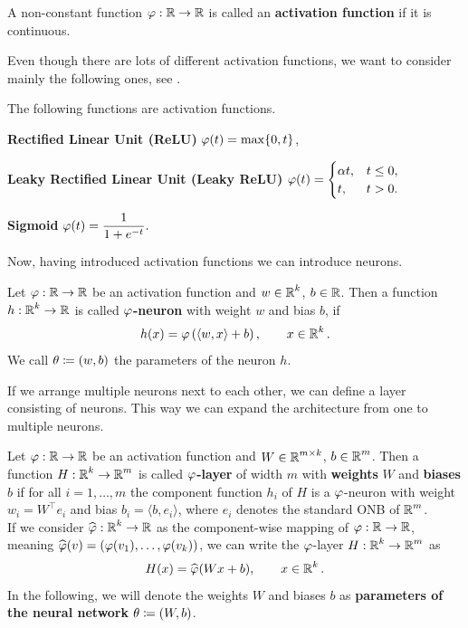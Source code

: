 \begin{definition}
A non-constant function $\operatorname{\varphi}: \operatorname{\mathbb{R}} \to \operatorname{\mathbb{R}}$ is called an \textbf{activation function} if it is continuous.
\end{definition}


Even though there are lots of different activation functions, we want to consider mainly the following ones, see \cite[chapter~6]{goodfellow2016deep}.


\begin{example}
The following functions are activation functions.
\begin{mydescription}{}
\item[\textbf{Rectified Linear Unit (ReLU)}] $\operatorname{\varphi}(t) = \max\{0, t\}$,
\item[\textbf{Leaky Rectified Linear Unit (Leaky ReLU)}] $\displaystyle \operatorname{\varphi}(t) = \begin{cases}
\alpha t, 	& t \leq 0,\\
t,		& t > 0.
\end{cases}$
\item[\textbf{Sigmoid}] $\displaystyle \operatorname{\varphi}(t) = \frac{1}{1 + e^{-t}}.$
\end{mydescription}
\end{example}


Now, having introduced activation functions we can introduce neurons.


\begin{definition}
Let $\operatorname{\varphi}: \operatorname{\mathbb{R}} \to \operatorname{\mathbb{R}}$ be an activation function and $w\in \operatorname{\mathbb{R}}^k$, $b \in \operatorname{\mathbb{R}}$. Then a function $h: \operatorname{\mathbb{R}}^k \to \operatorname{\mathbb{R}}$ is called \textbf{$\operatorname{\varphi}$-neuron} with weight $w$ and bias $b$, if
\begin{align}\label{def_neuron}
h(x) = \operatorname{\varphi} \left(\langle w, x \rangle + b \right), \qquad x \in \operatorname{\mathbb{R}}^k.
\end{align}
We call $\theta \coloneqq (w, b)$ the parameters of the neuron $h$.
\end{definition}


If we arrange multiple neurons next to each other, we can define a layer consisting of neurons. This way we can expand the architecture from one to multiple neurons.


\begin{definition}\label{def_layer}
Let $\operatorname{\varphi}: \operatorname{\mathbb{R}} \to \operatorname{\mathbb{R}}$ be an activation function and $W \in \operatorname{\mathbb{R}}^{m\times k}$, $b\in \operatorname{\mathbb{R}}^m$. Then a function $H:\operatorname{\mathbb{R}}^k \to \operatorname{\mathbb{R}}^m$ is called \textbf{$\operatorname{\varphi}$-layer} of width $m$ with \textbf{weights} $W$ and \textbf{biases} $b$ if for all $i=1,\ldots,m$ the component function $h_i$ of $H$ is a $\operatorname{\varphi}$-neuron with weight $w_i = W^\top e_i$ and bias $b_i = \langle b, e_i \rangle$, where $e_i$ denotes the standard ONB of $\operatorname{\mathbb{R}}^m$.\\
If we consider $\widehat{\operatorname{\varphi}}: \operatorname{\mathbb{R}}^k \to \operatorname{\mathbb{R}}$ as the component-wise mapping of $\operatorname{\varphi}:\operatorname{\mathbb{R}}\to \operatorname{\mathbb{R}}$, meaning $\widehat{\operatorname{\varphi}}(v) = (\operatorname{\varphi}(v_1), \ldots, \operatorname{\varphi}(v_k))$, we can write the $\operatorname{\varphi}$-layer $H:\operatorname{\mathbb{R}}^k \to \operatorname{\mathbb{R}}^m$ as
\begin{align}\label{eq_linear_layer}
H(x) = \widehat{\operatorname{\varphi}}(Wx + b), \qquad x \in \operatorname{\mathbb{R}}^k.
\end{align}
In the following, we will denote the weights $W$ and biases $b$ as \textbf{parameters of the neural network} $\theta \coloneqq (W, b)$.
\end{definition}


